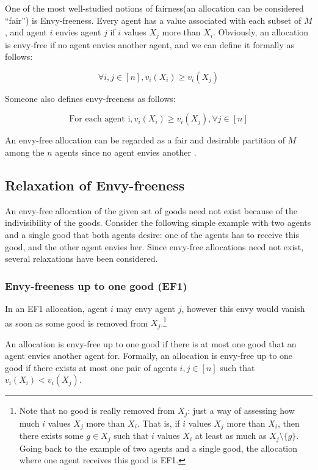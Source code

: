 \documentclass{article}
\begin{document}
One of the most well-studied notions of fairness(an allocation can be considered “fair”) is Envy-freeness. Every agent has a value associated with each subset of $M$, and agent $i$ envies agent $j$ if $i$ values $X_j$ more than $X_i$. Obviously, an allocation is envy-free if no agent envies another agent, and we can define it formally as follows:

\[
    \forall i, j \in [n], v_i(X_i) \geq v_i(X_j)  
\]

Someone also defines envy-freeness as follows:

\[
  \text{For each agent i}, v_i(X_i) \geq v_i(X_j), \forall j \in [n] 
\]

An envy-free allocation can be regarded as a fair and desirable partition of $M$ among the $n$ agents since no agent envies another \cite{DBLP:journals/corr/PlautR17}.

\subsection{Relaxation of Envy-freeness}

An envy-free allocation of the given set of goods need not exist because of the indivisibility of the goods.
Consider the following simple example with two agents and a single good that both agents desire: one of the agents has to receive this good, and the other agent envies her. Since envy-free allocations need not exist, several relaxations have been considered.

\subsubsection*{Envy-freeness up to one good (EF1)}

In an EF1 allocation, agent $i$ may envy agent $j$, however this envy would vanish as soon as some good is removed from $X_j$.\footnote{Note that no good is really removed from $X_j$: just a way of assessing how much $i$ values $X_j$ more than $X_i$. That is, if $i$ values $X_j$ more than $X_i$, then there exists some $g \in X_j$ such that $i$ values $X_i$ at least as much as $X_j \setminus \{g\}$. Going back to the example of two agents and a single good, the allocation where one agent receives this good is EF1.}

An allocation is envy-free up to one good if there is at most one good that an agent envies another agent for. Formally, an allocation is envy-free up to one good if there exists at most one pair of agents $i, j \in [n]$ such that $v_i(X_i) < v_i(X_j)$.
\end{document}
